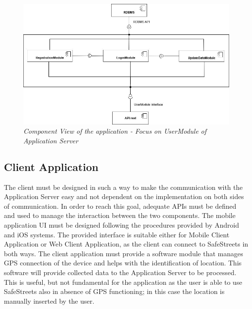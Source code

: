 \begin{figure}[H]
  \centering
  \includegraphics[origin=c,width=\textwidth]{DD_Images/ComponentView/componentViewUserModuleZoom.jpg}
  \caption{\textit{Component View of the application - Focus on UserModule of Application Server}}
\end{figure}

\subsection{Client Application}
The client must be designed in such a way to make the communication with the Application Server easy and not dependent 
on the implementation on both sides of communication. In order to reach this goal, adequate APIs must be defined and used 
to manage the interaction between the two components. The mobile application UI must be designed following the procedures 
provided by Android and iOS systems. The provided interface is suitable either for Mobile Client Application or Web Client Application,
as the client can connect to SafeStreets in both ways.
\newline The client application must provide a software module that manages GPS connection of the device and helps with 
the identification of location. This software will provide collected data to the Application Server to be processed. This 
is useful, but not fundamental for the application as the user is able to use SafeStreets also in absence of GPS 
functioning; in this case the location is manually inserted by the user.

